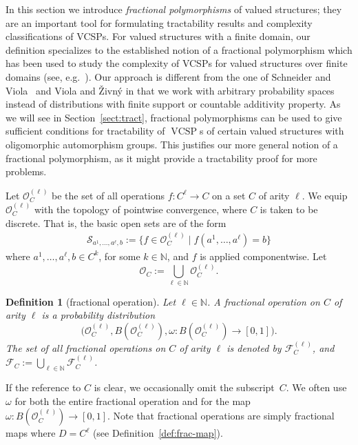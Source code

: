 \documentclass[nonacm]{acmart}
\DeclareMathOperator{\VCSP}{VCSP}
\newtheorem{definition}[theorem]{Definition}
\begin{document}
\label{sect:fpol}
In this section we introduce  \emph{fractional polymorphisms} of valued structures; they are an important tool for formulating tractability results and complexity classifications of VCSPs.
For valued structures with a finite domain, our definition specializes to the established notion of a fractional polymorphism which has been used 
to study the complexity of VCSPs for valued structures over finite domains (see, e.g.~\cite{ThapperZivny13}). 
Our approach is different from the one of Schneider and Viola~\cite{ViolaThesis,SchneiderViola} and Viola and \v{Z}ivn\'{y} \cite{ViolaZivny} in that we work with arbitrary probability spaces instead of distributions with finite support or countable additivity property.  
As we will see in Section~\ref{sect:tract}, fractional polymorphisms can be used to give sufficient conditions for tractability of $\VCSP$s of certain valued structures with oligomorphic automorphism groups. This justifies our more general notion of a fractional polymorphism, as it might provide a tractability proof for more problems.

Let ${\mathscr O}_C^{(\ell)}$ be the set of all operations $f \colon C^{\ell} \to C$ on a set $C$ of arity $\ell$.
We equip ${\mathscr O}_C^{(\ell)}$ with the topology of pointwise convergence, where $C$ is taken to be discrete. That is, the basic open sets are of the form
\begin{align}
{\mathscr S}_{a^1,\dots,a^{\ell}, b} := \{ f \in {\mathscr O}^{(\ell)}_C \mid f(a^1,\dots,a^{\ell}) = b \}
\label{eq:S}
\end{align}
where $a^1,\dots,a^{\ell}, b\in C^{k}$, for some $k \in {\mathbb N}$, and $f$ is applied componentwise. 
Let $${\mathscr O}_C := \bigcup_{\ell \in {\mathbb N}} {\mathscr O}_C^{(\ell)}.$$

\begin{definition}[fractional operation]
Let $\ell \in {\mathbb N}$. 
A \emph{fractional operation on $C$ of arity $\ell$} is a probability distribution 
$$\big({\mathscr O}_C^{(\ell)},B({\mathscr O}_C^{(\ell)}), \omega \colon B({\mathscr O}_C^{(\ell)}) \to [0,1] \big).$$ 
The set of all fractional operations on $C$ of arity $\ell$ is denoted by ${\mathscr F}^{(\ell)}_C$, and ${\mathscr F}_C := \bigcup_{\ell \in {\mathbb N}} {\mathscr F}^{(\ell)}_C$.
\end{definition}

If the reference to $C$ is clear, we occasionally omit the subscript~$C$. 
We often use $\omega$ for both the entire fractional operation and for the map $\omega \colon B({\mathscr O}_C^{(\ell)}) \to [0,1]$. Note that fractional operations are simply fractional maps where $D=C^\ell$ (see Definition~\ref{def:frac-map}).
\end{document}
